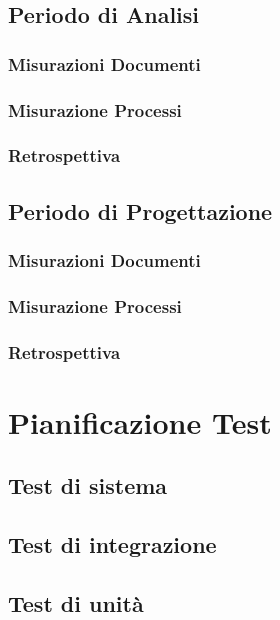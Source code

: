 \documentclass[a4paper, oneside, openany, dvipsnames, table]{article}
\begin{document}
	\label{app:misure}
	\subsection{Periodo di Analisi}
		\subsubsection{Misurazioni Documenti}
			
		\subsubsection{Misurazione Processi}
			
		\subsubsection{Retrospettiva}
			
		
\newpage	
	\subsection{Periodo di Progettazione}
		\subsubsection{Misurazioni Documenti}
			
		\subsubsection{Misurazione Processi}
			
		\subsubsection{Retrospettiva}
			
\newpage
\section{Pianificazione Test}
\subsection{Test di sistema}
	
\subsection{Test di integrazione}
	
\subsection{Test di unità}
	
	
% 		
% 		
\end{document}
